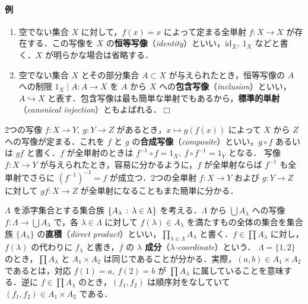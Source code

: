 \documentclass[pandoc,base=10pt,b5j,precisetext]{bxjsarticle}
\providecommand{\tightlist}{%
  \setlength{\itemsep}{0pt}\setlength{\parskip}{0pt}}
\let\oldparagraph\paragraph
\renewcommand{\paragraph}[1]{\oldparagraph{#1}\mbox{}}
\begin{document}
\hypertarget{ux4f8b-1}{%
\paragraph{例}\label{ux4f8b-1}}

\begin{enumerate}
\def\labelenumi{\roman{enumi})}
\tightlist
\item
  空でない集合 \(X\) に対して，\(f(x) = x\) によって定まる全単射
  \(f \colon X \to X\) が存在する．この写像を \(X\)
  の\textbf{恒等写像}（\emph{identity}）といい，\(\mathrm{id}_X,\ 1_X\)
  などと書く．\(X\) が明らかな場合は省略する．
\item
  空でない集合 \(X\) とその部分集合 \(A \subset X\)
  が与えられたとき，恒等写像の \(A\) への制限
  \(1_X \mid A \colon A \to X\) を \(A\) から \(X\)
  への\textbf{包含写像}（\emph{inclusion}）といい，\(A \hookrightarrow X\)
  と表す．包含写像は最も簡単な単射でもあるから，\textbf{標準的単射}（\emph{canonical
  injection}）ともよばれる．\(\Box\)
\end{enumerate}

2つの写像 \(f \colon X \to Y,\ g \colon Y \to Z\)
があるとき，\(x \mapsto g(f(x))\) によって \(X\) から \(Z\)
への写像が定まる．これを \(f\) と \(g\)
の\textbf{合成写像}（\emph{composite}）といい，\(g \circ f\) あるいは
\(gf\) と書く．\(f\) が全単射のときは
\(f^{-1} \circ f = 1_X,\ f \circ f^{-1} = 1_Y\) となる． 写像
\(f \colon X \to Y\) が与えられたとき，容易に分かるように，\(f\)
が全単射ならば \(f^{-1}\) も全単射でさらに \((f^{-1})^{-1} = f\)
が成立つ．2つの全単射 \(f \colon X \to Y\) および \(g \colon Y \to Z\)
に対して \(gf \colon X \to Z\) が全単射になることもまた簡単に分かる．

\(\Lambda\) を添字集合とする集合族
\(\{ A_\lambda \,:\, \lambda \in \Lambda \}\) を考える．\(\Lambda\) から
\(\bigcup A_\lambda\) への写像
\(f \colon \Lambda \to \bigcup A_\lambda\) で，各
\(\lambda \in \Lambda\) に対して \(f(\lambda) \in A_\lambda\)
を満たすもの全体の集合を集合族 \(\{ A_\lambda \}\)
の\textbf{直積}（\emph{direct
product}）といい，\(\prod_{\lambda \in \Lambda} A_\lambda\)
と書く．\(f \in \prod A_\lambda\) に対し，\(f(\lambda)\) の代わりに
\(f_\lambda\) と書き，\(f\) の \textbf{\(\lambda\)
成分}（\emph{\(\lambda\)-coordinate}）という． \(\Lambda = \{1, 2\}\)
のとき，\(\prod A_\lambda\) と \(A_1 \times A_2\)
は同じであることが分かる．実際，\((a,b) \in A_1 \times A_2\)
であるとは，対応 \(f(1) = a,\ f(2) = b\) が \(\prod A_\lambda\)
に属していることを意味する．逆に \(f \in \prod A_\lambda\)
のとき，\((f_1, f_2)\) は順序対をなしていて
\((f_1, f_2) \in A_1 \times A_2\) である．
\end{document}
